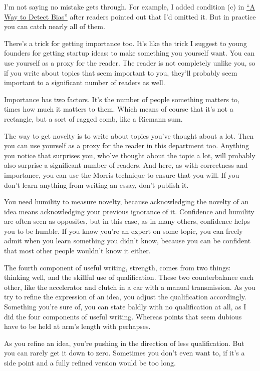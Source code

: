 I'm not saying no mistake gets through. For example, I added condition
(c) in \href{bias.html}{``A Way to Detect Bias''} after readers pointed
out that I'd omitted it. But in practice you can catch nearly all of
them.

There's a trick for getting importance too. It's like the trick I
suggest to young founders for getting startup ideas: to make something
you yourself want. You can use yourself as a proxy for the reader. The
reader is not completely unlike you, so if you write about topics that
seem important to you, they'll probably seem important to a significant
number of readers as well.

Importance has two factors. It's the number of people something matters
to, times how much it matters to them. Which means of course that it's
not a rectangle, but a sort of ragged comb, like a Riemann sum.

The way to get novelty is to write about topics you've thought about a
lot. Then you can use yourself as a proxy for the reader in this
department too. Anything you notice that surprises you, who've thought
about the topic a lot, will probably also surprise a significant number
of readers. And here, as with correctness and importance, you can use
the Morris technique to ensure that you will. If you don't learn
anything from writing an essay, don't publish it.

You need humility to measure novelty, because acknowledging the novelty
of an idea means acknowledging your previous ignorance of it. Confidence
and humility are often seen as opposites, but in this case, as in many
others, confidence helps you to be humble. If you know you're an expert
on some topic, you can freely admit when you learn something you didn't
know, because you can be confident that most other people wouldn't know
it either.

The fourth component of useful writing, strength, comes from two things:
thinking well, and the skillful use of qualification. These two
counterbalance each other, like the accelerator and clutch in a car with
a manual transmission. As you try to refine the expression of an idea,
you adjust the qualification accordingly. Something you're sure of, you
can state baldly with no qualification at all, as I did the four
components of useful writing. Whereas points that seem dubious have to
be held at arm's length with perhapses.

As you refine an idea, you're pushing in the direction of less
qualification. But you can rarely get it down to zero. Sometimes you
don't even want to, if it's a side point and a fully refined version
would be too long.

